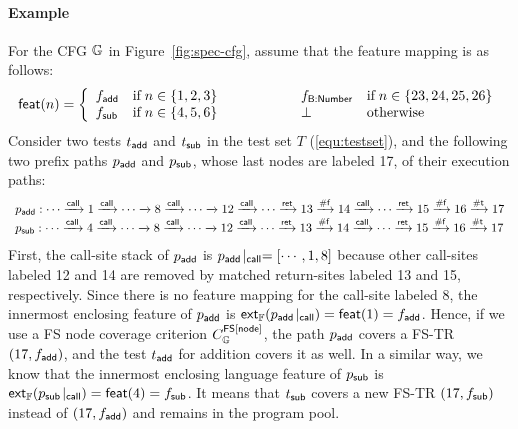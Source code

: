 \paragraph{\textbf{Example}}
%
For the CFG $\mathbb{G}$ in Figure~\ref{fig:spec-cfg}, assume that the feature
mapping is as follows:
\begin{equation}\label{equ:featmap}
  \textsf{feat}(n) = \left\{
    \begin{array}{lllll}
      f_{\textsf{add}} & \text{if} \; n \in \{ 1, 2, 3\} &\qquad\qquad&
      f_{\textsf{B:Number}} & \text{if} \; n \in \{ 23, 24, 25, 26 \} \\

      f_{\textsf{sub}} & \text{if} \; n \in \{ 4, 5, 6\} &&
      \bot & \text{otherwise}
    \end{array}
  \right.
\end{equation}
%
Consider two tests $t_{\textsf{add}}$ and $t_{\textsf{sub}}$ in the test set $T$
(\ref{equ:testset}), and the following two prefix paths $p_{\textsf{add}}$ and $p_{\textsf{sub}}$,
whose last nodes are labeled 17, of their execution paths:
%
\[
  \begin{array}{l}
    p_{\textsf{add}}: \cdots \xrightarrow{\textsf{call}} 1 \xrightarrow{\textsf{call}} \cdots \xrightarrow{} 8 \xrightarrow{\textsf{call}} \cdots \xrightarrow{} 12 \xrightarrow{\textsf{call}}
    \cdots \xrightarrow{\textsf{ret}} 13 \xrightarrow{\textsf{\#f}} 14 \xrightarrow{\textsf{call}} \cdots \xrightarrow{\textsf{ret}} 15 \xrightarrow{\textsf{\#f}} 16 \xrightarrow{\textsf{\#t}} 17\\

    p_{\textsf{sub}}:\cdots \xrightarrow{\textsf{call}} 4 \xrightarrow{\textsf{call}} \cdots \xrightarrow{} 8 \xrightarrow{\textsf{call}} \cdots \xrightarrow{} 12 \xrightarrow{\textsf{call}}
    \cdots \xrightarrow{\textsf{ret}} 13 \xrightarrow{\textsf{\#f}} 14 \xrightarrow{\textsf{call}} \cdots \xrightarrow{\textsf{ret}} 15 \xrightarrow{\textsf{\#f}} 16 \xrightarrow{\textsf{\#t}} 17\\
  \end{array}
\]
%
First, the call-site stack of $p_{\textsf{add}}$ is ${p_{\textsf{add}}}\!\mid_{\textsf{call}} = [\cdots, 1, 8]$
because other call-sites labeled 12 and 14 are removed by matched return-sites
labeled 13 and 15, respectively.
%
Since there is no feature mapping for the call-site labeled 8, the innermost enclosing
feature of $p_{\textsf{add}}$ is $\textsf{ext}_{\mathbb{F}}({p_{\textsf{add}}}\!\mid_{\textsf{call}}) = \textsf{feat}(1) =
f_{\textsf{add}}$.
%
Hence, if we use a FS node coverage criterion $C_{\mathbb{G}}^{\textsf{FS}[\textsf{node}]}$, the path
$p_{\textsf{add}}$ covers a FS-TR $(17, f_{\textsf{add}})$, and the test $t_{\textsf{add}}$ for addition
covers it as well.
%
In a similar way, we know that the innermost enclosing language feature of $p_{\textsf{sub}}$
is $\textsf{ext}_{\mathbb{F}}({p_{\textsf{sub}}}\!\mid_{\textsf{call}}) = \textsf{feat}(4) = f_{\textsf{sub}}$.
%
It means that $t_{\textsf{sub}}$ covers a new FS-TR $(17, f_{\textsf{sub}})$ instead of $(17,
f_{\textsf{add}})$ and remains in the program pool.


